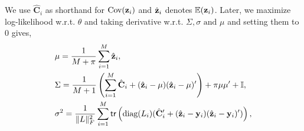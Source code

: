 \begin{comment}
\textbf{E step}: We calculate the expected log-likelihood as,
$$Q(\theta) = \E_{\{\z_i\}^M | \{ \phi(\y_i) \}^M, \mu, \Sigma }( -\log (f ( \{ \phi(y_i )  \}^M, \{\z_i\}^M  \vert \theta)f(\mu,\Sigma)  ), $$

The log of the likelihood function is given by,
\begin{equation}
\begin{aligned}
&\textit{L} \left(\theta \vert \{ \phi(y_i ) \}^M, \{ \z_i\}^M \right)
= \log(f \left( \{ \phi(y_i ) \}^M, \{ \z_i\}^M \vert \theta \right)),\\
&=   -\frac{1}{2} \mathlarger{ \sum}_{i = 1}^M [   \z_i' \left( \frac{\diag(L_i)}{\sigma^2} + \Sigma^{-1} \right) \z_i   - 2\left( \frac{y_i' \diag(L_i)}{\sigma^2}+\mu' \Sigma^{-1}  \right)\z_i  \\
&+ \frac{y_i' \diag(L_i) y_i}{\sigma^2}  + \mu'\Sigma^{-1}\mu  ]  - \log \left((\sqrt{2\pi\sigma})^{\| L\|_F^2} (2\pi \det(\Sigma))^\frac{M}{2}\right),\\
 \end{aligned}
 \label{eq:likelihood}
\end{equation}
Thus after some algebraic manipulation we have,
\begin{equation}
\begin{aligned}
\label{eq:estep}
Q(\theta) & = \text{Const} +  \mathlarger{ \sum}_{i = 1}^M   [ \tr \left( \left( \frac{\diag(L_i)}{\sigma^2} + \Sigma^{-1} \right) (\hat{\mathbf{C}}_i + \hat{\z}_i  \hat{\z}_i') \right) \\
&-2\left( \frac{\y_i' \diag(L_i)}{\sigma^2} +\mu' \Sigma^{-1}  \right)\hat{\z}_i   + \frac{\y_i' \diag(L_i) \y_i}{\sigma^2}  \\
&+ \mu'\Sigma^{-1}\mu  + \frac{ \| L\|_F^2}{M} \log(\sigma^2) + \log(\det(\Sigma)) ] \\ &+\log(\det(\Sigma))+\pi\mu'\Sigma^{-1}\mu+\tr(\Sigma^{-1}) ,
 \end{aligned}
\end{equation}
\end{comment}

We use $\hat{\mathbf{C}}_i$ as shorthand for  $\text{Cov}(\mathbf{z}_i)$ and $\hat{\mathbf{z}}_i$ denotes  $\mathbb{E}(\mathbf{z}_i)$. Later, we maximize log-likelihood w.r.t. $\theta$ and
taking derivative w.r.t. $\Sigma,\sigma \text{ and }\mu$ and setting them to 0 gives,
\begin{equation}
\label{eq:maximization}
\begin{aligned}
&\mu = \frac{1}{M +\pi} \sum_{i = 1}^M \hat{\mathbf{z}}_i,  \\
&  \Sigma = \frac{1}{M+1} \left(\sum_{i = 1}^{M}\hat{\mathbf{C}}_i + (\hat{\mathbf{z}}_i -\mu)(\hat{\mathbf{z}}_i -\mu)'\right) +\pi\mu\mu' +\mathbb{I},\\
& \sigma^2 = \frac{1}{\|L\|_F^2} \sum_{i = 1}^{M}  {\sf tr}\left(\text{diag}(L_i)(\hat{\mathbf{C}}_i' + (\hat{\mathbf{z}}_i - \mathbf{y}_i)(\hat{\mathbf{z}}_i - \mathbf{y}_i)' )\right),\\
 \end{aligned}
\end{equation}

